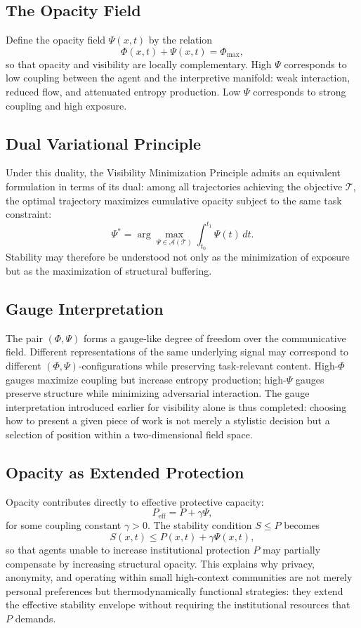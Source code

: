 \documentclass[12pt,a4paper]{article}
\begin{document}
\subsection{The Opacity Field}

Define the opacity field $\Psi(x,t)$ by the relation
\[
\Phi(x,t) + \Psi(x,t) = \Phi_{\max},
\]
so that opacity and visibility are locally complementary. High $\Psi$ corresponds to low coupling between the agent and the interpretive manifold: weak interaction, reduced flow, and attenuated entropy production. Low $\Psi$ corresponds to strong coupling and high exposure.

\subsection{Dual Variational Principle}

Under this duality, the Visibility Minimization Principle admits an equivalent formulation in terms of its dual: among all trajectories achieving the objective $\mathcal{T}$, the optimal trajectory maximizes cumulative opacity subject to the same task constraint:
\[
\Psi^\ast = \arg\max_{\Psi \in \mathcal{A}(\mathcal{T})} \int_{t_0}^{t_1} \Psi(t)\,dt.
\]
Stability may therefore be understood not only as the minimization of exposure but as the maximization of structural buffering.

\subsection{Gauge Interpretation}

The pair $(\Phi, \Psi)$ forms a gauge-like degree of freedom over the communicative field. Different representations of the same underlying signal may correspond to different $(\Phi, \Psi)$-configurations while preserving task-relevant content. High-$\Phi$ gauges maximize coupling but increase entropy production; high-$\Psi$ gauges preserve structure while minimizing adversarial interaction. The gauge interpretation introduced earlier for visibility alone is thus completed: choosing how to present a given piece of work is not merely a stylistic decision but a selection of position within a two-dimensional field space.

\subsection{Opacity as Extended Protection}

Opacity contributes directly to effective protective capacity:
\[
P_{\text{eff}} = P + \gamma \Psi,
\]
for some coupling constant $\gamma > 0$. The stability condition $S \leq P$ becomes
\[
S(x,t) \leq P(x,t) + \gamma \Psi(x,t),
\]
so that agents unable to increase institutional protection $P$ may partially compensate by increasing structural opacity. This explains why privacy, anonymity, and operating within small high-context communities are not merely personal preferences but thermodynamically functional strategies: they extend the effective stability envelope without requiring the institutional resources that $P$ demands.
\end{document}
